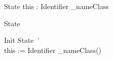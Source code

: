 %
\begin{schema}{State}
 	this : \circref \lpar Identifier \rpar_{name}Class
\end{schema}
%
\begin{circusaction}
\circstate State
\end{circusaction}
%
\begin{schema}{Init}
  State~' \\
  this := \circnew \lpar Identifier \rpar_{name}Class()
\end{schema}
%
